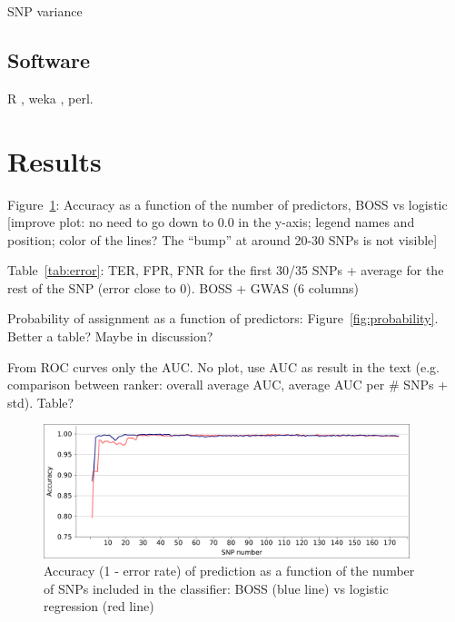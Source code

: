 SNP variance \cite{gianola2009additive}

\subsection{Software}
\label{sec:software}
R \cite{r2008manual}, weka \cite{hall2009weka}, perl.

\section{Results}
\label{sec:results}

Figure~\ref{fig:accuracy}: Accuracy as a function of the number of
predictors, BOSS vs logistic [improve plot: no need to go down to 0.0 in
the y-axis; legend names and position; color of the lines? The ``bump''
at around 20-30 SNPs is not visible]

Table~\ref{tab:error}: TER, FPR, FNR for the first 30/35 SNPs + average for the
rest of the SNP (error close to $0$). BOSS + GWAS (6 columns)


Probability of assignment as a function of predictors:
Figure~\ref{fig:probability}. Better a table? Maybe in discussion?

From ROC curves only the AUC. No plot, use AUC as result in the text (e.g.
comparison between ranker: overall average AUC, average AUC per \# SNPs
+ std). Table?

\begin{figure}
\includegraphics[width=0.95\textwidth]{accuracy.pdf}
\caption{Accuracy (1 - error rate) of prediction as a function of the
  number of SNPs included in the classifier: BOSS (blue line) vs
  logistic regression (red line)}
\label{fig:accuracy}       %
\end{figure}

